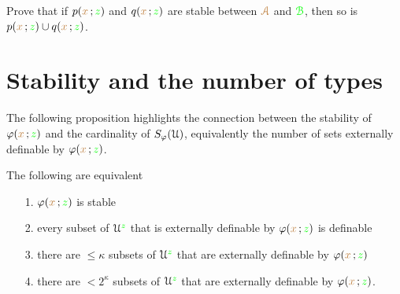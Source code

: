   
  
  
  
  
  
  
  
  

  \begin{exercise}\label{ex_stability_conjunction}
    Prove that if $p({\color{brown} x}\,;{\color{green} z})$ and $q({\color{brown} x}\,;{\color{green} z})$ are stable between ${\color{brown}\EuScript A}$ and ${\color{green}\EuScript B}$, then so is $p({\color{brown} x}\,;{\color{green} z})\cup q({\color{brown} x}\,;{\color{green} z})$.
  \end{exercise}

\section{Stability and the number of types}


The following proposition highlights the connection between the stability of $\varphi({\color{brown} x}\,;{\color{green} z})$ and the cardinality of $S_\varphi(\EuScript U)$, equivalently the number of sets externally definable by $\varphi({\color{brown} x}\,;{\color{green} z})$. 

\begin{theorem}\label{thm_def_stable_formula2}
   The following are equivalent
   \begin{itemize}
     \item[1.] $\varphi({\color{brown} x}\,;{\color{green} z})$ is stable
     \item[2.] every subset of $\EuScript U^{\color{green} z}$ that is externally definable by $\varphi({\color{brown} x}\,;{\color{green} z})$ is definable
     \item[3.] there are $\le\kappa$ subsets of $\EuScript U^{\color{green} z}$ that are externally definable by $\varphi({\color{brown} x}\,;{\color{green} z})$
     \item[4.] there are $<2^\kappa$ subsets of $\EuScript U^{\color{green} z}$ that are externally definable by $\varphi({\color{brown} x}\,;{\color{green} z})$.
   \end{itemize}
 \end{theorem}
 
